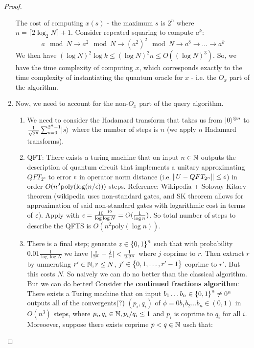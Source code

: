 \begin{proof}
\begin{enumerate}
        The cost of computing $x(s)$ - the maximum $s$ is $2^n$ where $n = \lceil 2\log_2 N \rceil + 1$. Consider repeated squaring to compute $a^k$:
        \begin{equation}
            a \mod N \to a^2 \mod N \to (a^2)^2 \mod N \to a^8 \to \ldots \to a^k
        \end{equation}
        We then have $(\log N)^2 \log k \leq (\log N)^2 n \leq O((\log N)^3)$. So, we have the time complexity of computing $x$, which corresponds exactly to the time complexity of instantiating the quantum oracle for $x$ - i.e. the $O_x$ part of the algorithm. 
        \item Now, we need to account for the non-$O_x$ part of the query algorithm. 
        \begin{enumerate}
            \item We need to consider the Hadamard transform that takes us from $\lvert 0 \rangle^{\otimes n}$ to $\frac{1}{\sqrt{2^n}}\sum_{s=0}^{2^n-1}\lvert s \rangle$ where the number of steps is $n$ (we apply $n$ Hadamard transforms).
            \item QFT: There exists a turing machine that on input $n \in \mathbb{N}$ outputs the description of quantum circuit that implements a unitary approximating $QFT_{2^n}$ to error $\epsilon$ in operator norm distance (i.e. $\norm{U - QFT_{2^n}} \leq \epsilon$) in order $O(n^2\text{poly}(\log(n/\epsilon)))$ steps. Reference: Wikipedia + Solovay-Kitaev theorem (wikipedia uses non-standard gates, and SK theorem allows for approximation of said non-standard gates with logarithmic cost in terms of $\epsilon$). Apply with $\epsilon = \frac{10^{-10}}{\log\log N} = O(\frac{1}{\log n})$. So total number of steps to describe the QFTS is $O(n^2\text{poly}(\log n))$. 
            \item There is a final step; generate $z \in \set{0, 1}^n$ such that with probability $0.01\frac{1}{\log \log N}$ we have $\lvert \frac{z}{2^n} - \frac{j}{r} \rvert < \frac{1}{2 \cdot 2^n}$ where $j$ coprime to $r$. Then extract $r$ by unmerating $r' \in \mathbb{N}, r \leq N$, $j' \in \set{0, 1, \ldots, r'-1}$ coprime to $r'$. But this costs $N$. So naively we can do no better than the classical algorithm. But we can do better! Consider the \textbf{continued fractions algorithm}: There exists a Turing machine that on input $b_1\ldots b_n \in \set{0, 1}^n \neq 0^n$ outputs all of the convergents(?) $(p_i, q_i)$ of $\phi = 0b_1b_2\ldots b_n \in (0, 1)$ in $O(n^3)$ steps, where $p_i, q_i \in \mathbb{N}, p_i/q_i \leq 1$ and $p_i$ is coprime to $q_i$ for all $i$. Moreoever, suppose there exists coprime $p < q \in \mathbb{N}$ usch that:

\end{enumerate}
\end{enumerate}
\end{proof}
